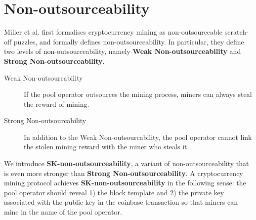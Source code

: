 \section{Non-outsourceability}



Miller et al. \cite{miller2015nonoutsourceable} first formalises cryptocurrency mining as non-outsourceable scratch-off puzzles, and formally defines non-outsourceability.
In particular, they define two levels of non-outsourceability, namely \textbf{Weak Non-outsourceability} and \textbf{Strong Non-outsourceability}.

\begin{description}
    \item[Weak Non-outsourcability] If the pool operator outsources the mining process, miners can always steal the reward of mining.
    \item[Strong Non-outsourcability] In addition to the Weak Non-outsourcability, the pool operator cannot link the stolen mining reward with the miner who steals it.
\end{description}

We introduce \textbf{SK-non-outsourceability}, a variant of non-outsourceability that is even more stronger than \textbf{Strong Non-outsourceability}.
A cryptocurrency mining protocol achieves \textbf{SK-non-outsourceability} in the following sense: the pool operator should reveal 1) the block template and 2) the private key associated with the public key in the coinbase transaction so that miners can mine in the name of the pool operator.

